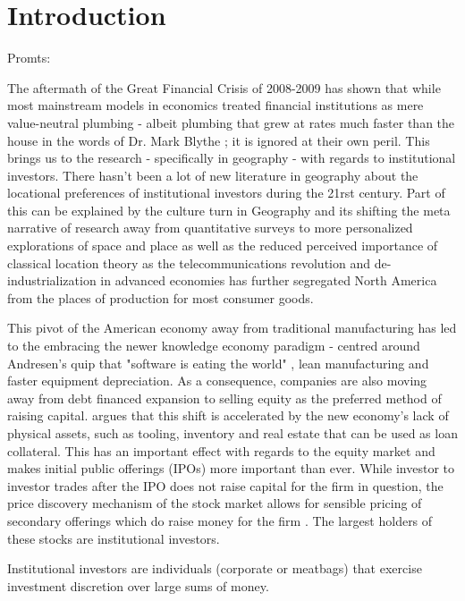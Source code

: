 \chapter{Introduction}
\label{ChapterI}


Promts:


The aftermath of the Great Financial Crisis of 2008-2009 has shown that while most mainstream models in economics treated financial institutions as mere value-neutral plumbing - albeit plumbing that grew at rates much faster than the house in the words of Dr. Mark Blythe ; it is ignored at their own peril.  This brings us to the research - specifically in geography - with regards to institutional investors. There hasn't been a lot of new literature in geography about the locational preferences of institutional investors during the 21rst century.  Part of this can be explained by the culture turn in Geography and its shifting the meta narrative of research away from quantitative surveys to more personalized explorations of space and place as well as the reduced perceived importance of classical location theory as the telecommunications revolution and de-industrialization in advanced economies has further segregated North America from the places of production for most consumer goods.    

This pivot of the American economy away from traditional manufacturing has led to the embracing the newer knowledge economy paradigm - centred around Andresen's quip that "software is eating the world" \cite{Andressen2011}, lean manufacturing and faster equipment depreciation.  As a consequence, companies are also moving away from debt financed expansion to selling equity as the preferred method of raising capital. 	\cite{Graves2003} argues that this shift is accelerated by the new economy's lack of physical assets, such as tooling, inventory and real estate that can be used as loan collateral. This has an important effect with regards to the equity market and makes initial public offerings (IPOs) more important than ever. While investor to investor trades after the IPO does not raise capital for the firm in question, the price discovery mechanism of the stock market allows for sensible pricing of secondary offerings which do raise money for the firm \citep{Tobin1969}.   The largest holders of these stocks are institutional investors.  

Institutional investors are individuals (corporate or meatbags) that exercise investment discretion over large sums of money.  





